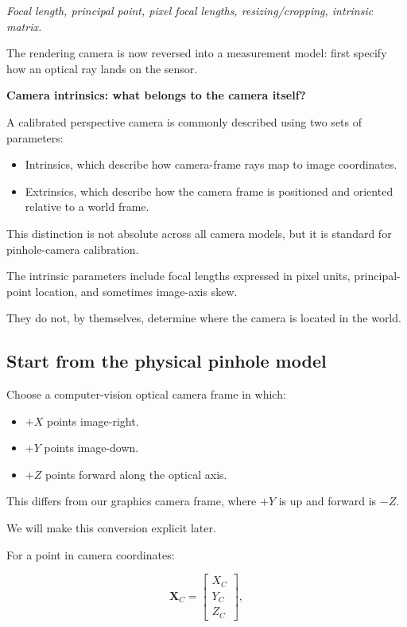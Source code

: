 \emph{Focal length, principal point, pixel focal lengths, resizing/cropping, intrinsic matrix.}

The rendering camera is now reversed into a measurement model: first specify how an optical ray lands on the sensor.

\textbf{Camera intrinsics: what belongs to the camera itself?}

A calibrated perspective camera is commonly described using two sets of parameters:

\begin{itemize}
\tightlist
\item
  Intrinsics, which describe how camera-frame rays map to image coordinates.
\item
  Extrinsics, which describe how the camera frame is positioned and oriented relative to a world frame.
\end{itemize}

This distinction is not absolute across all camera models, but it is standard for pinhole-camera calibration.

The intrinsic parameters include focal lengths expressed in pixel units, principal-point location, and sometimes image-axis skew.

They do not, by themselves, determine where the camera is located in the world.

\subsection{Start from the physical pinhole model}\label{02-foundations-ii-ch034-start-from-the-physical-pinhole-model}

Choose a computer-vision optical camera frame in which:

\begin{itemize}
\tightlist
\item
  \(+X\) points image-right.
\item
  \(+Y\) points image-down.
\item
  \(+Z\) points forward along the optical axis.
\end{itemize}

This differs from our graphics camera frame, where \(+Y\) is up and forward is \(-Z\).

We will make this conversion explicit later.

For a point in camera coordinates:

\[
 \mathbf X_C= \begin{bmatrix} X_C\\Y_C\\Z_C \end{bmatrix},
\]

